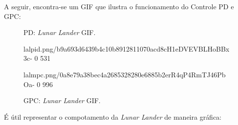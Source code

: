 \documentclass[12pt,           %
a4paper,                       %
openany,                       %
oneside,                       %
chapter=TITLE,                 %
english,                       %
spanish,                       %
brazil,                        %
sumario=tradicional]{abntex2}  %
\begin{document}
\begin{OnehalfSpace}
A seguir, encontra-se um GIF que ilustra o funcionamento do Controle PD e GPC:

\begin{figure}[H]
  \begin{minipage}{0.5\textwidth}
    \centering
    \caption{PD: \textit{Lunar Lander} GIF.}
    {lalpid.png/b9a693d6439b4c10b8912811070acd8cH1eDVEVBLHoBBx3c-}%
    {0}%
    {531}%
    \label{fig:pct}
  \end{minipage}
  \begin{minipage}{0.5\textwidth}
    \centering
    \caption{GPC: \textit{Lunar Lander} GIF.}
    {lalmpc.png/0a8e79a38bec4a2685328280e6885b2erR4qP4RmTJ46PbOa-}%
    {0}%
    {996}%
    \label{fig:gct}
  \end{minipage}
\end{figure}
\vspace*{-.725cm}
{\raggedright {}}

É útil representar o compotamento da \textit{Lunar Lander} de maneira gráfica:


\end{OnehalfSpace}
\end{document}
